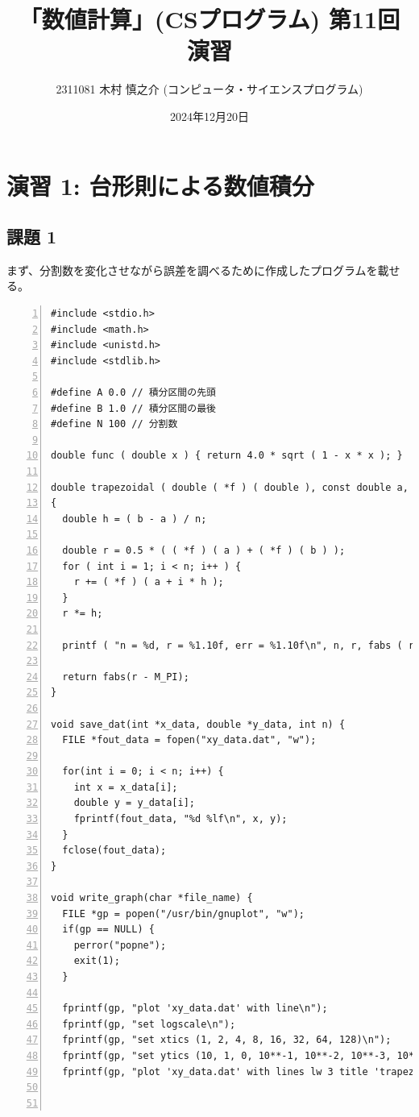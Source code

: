 \documentclass[a4paper]{jsarticle}
\title{「数値計算」(CSプログラム) 第11回 演習}
\author{2311081 木村 慎之介 (コンピュータ・サイエンスプログラム)}
\date{2024年12月20日}
\begin{document}
\maketitle

\section*{演習 1: 台形則による数値積分}

\subsection*{課題 1}
まず、分割数を変化させながら誤差を調べるために作成したプログラムを載せる。
\begin{lstlisting}[caption={\texttt{台形則による数値積分とその誤差を求めるコード}}, numbers=left, label={trapezoidal}]
#include <stdio.h>
#include <math.h>
#include <unistd.h>
#include <stdlib.h>

#define A 0.0 // 積分区間の先頭
#define B 1.0 // 積分区間の最後
#define N 100 // 分割数

double func ( double x ) { return 4.0 * sqrt ( 1 - x * x ); }

double trapezoidal ( double ( *f ) ( double ), const double a, const double b, const int n )
{
  double h = ( b - a ) / n;

  double r = 0.5 * ( ( *f ) ( a ) + ( *f ) ( b ) );
  for ( int i = 1; i < n; i++ ) {
    r += ( *f ) ( a + i * h );
  }
  r *= h;

  printf ( "n = %d, r = %1.10f, err = %1.10f\n", n, r, fabs ( r - M_PI ) );

  return fabs(r - M_PI);
}

void save_dat(int *x_data, double *y_data, int n) {
  FILE *fout_data = fopen("xy_data.dat", "w");

  for(int i = 0; i < n; i++) {
    int x = x_data[i];
    double y = y_data[i];
    fprintf(fout_data, "%d %lf\n", x, y);
  }
  fclose(fout_data);
}

void write_graph(char *file_name) {
  FILE *gp = popen("/usr/bin/gnuplot", "w");
  if(gp == NULL) {
    perror("popne");
    exit(1);
  }

  fprintf(gp, "plot 'xy_data.dat' with line\n");
  fprintf(gp, "set logscale\n");
  fprintf(gp, "set xtics (1, 2, 4, 8, 16, 32, 64, 128)\n");
  fprintf(gp, "set ytics (10, 1, 0, 10**-1, 10**-2, 10**-3, 10**-4, 10**-5, 10**-6, 10**-7, 10**-8)\n");
  fprintf(gp, "plot 'xy_data.dat' with lines lw 3 title 'trapezoidal\n");



\end{lstlisting}
\end{document}
